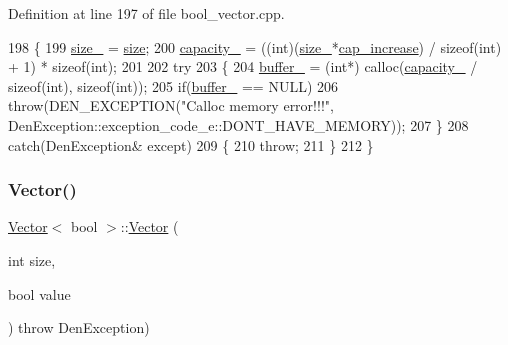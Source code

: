 Definition at line 197 of file bool\+\_\+vector.\+cpp.


\begin{DoxyCode}
198     \{
199         \hyperlink{classVector_3_01bool_01_4_a07895adb41b2c819f85640e35c0d4ae0}{size\_} = \hyperlink{classVector_3_01bool_01_4_acb9a245334b171ea1ad0d9bda20da76e}{size};
200         \hyperlink{classVector_3_01bool_01_4_ac3da0e4580bca55cab445ed3f9c50f2d}{capacity\_} = ((int)(\hyperlink{classVector_3_01bool_01_4_a07895adb41b2c819f85640e35c0d4ae0}{size\_}*\hyperlink{classVector_3_01bool_01_4_a6fe84e4e9414012807ec5ccd49711e62}{cap\_increase}) / \textcolor{keyword}{sizeof}(int) + 1) * \textcolor{keyword}{sizeof}(int);
201 
202         \textcolor{keywordflow}{try}
203             \{
204                 \hyperlink{classVector_3_01bool_01_4_ae2183c11de877eb13209c6a5a593604f}{buffer\_} = (\textcolor{keywordtype}{int}*) calloc(\hyperlink{classVector_3_01bool_01_4_ac3da0e4580bca55cab445ed3f9c50f2d}{capacity\_} / \textcolor{keyword}{sizeof}(\textcolor{keywordtype}{int}), \textcolor{keyword}{sizeof}(int));
205                 \textcolor{keywordflow}{if}(\hyperlink{classVector_3_01bool_01_4_ae2183c11de877eb13209c6a5a593604f}{buffer\_} == NULL)
206                     \textcolor{keywordflow}{throw}(DEN\_EXCEPTION(\textcolor{stringliteral}{"Calloc memory error!!!"}, 
      DenException::exception\_code\_e::DONT\_HAVE\_MEMORY));
207             \}
208         \textcolor{keywordflow}{catch}(DenException& except)
209             \{
210                 \textcolor{keywordflow}{throw};
211             \}
212     \}
\end{DoxyCode}
\mbox{\label{classVector_3_01bool_01_4_a1c11bbbd5699e7abaa5a4baf80e51efe}} 
\subsubsection{\texorpdfstring{Vector()}{Vector()}\hspace{0.1cm}{\footnotesize\ttfamily [2/5]}}
{\footnotesize\ttfamily \hyperlink{classVector}{Vector}$<$ bool $>$\+::\hyperlink{classVector}{Vector} (\begin{DoxyParamCaption}\item[{int}]{size,  }\item[{bool}]{value }\end{DoxyParamCaption}) throw  Den\+Exception) }



